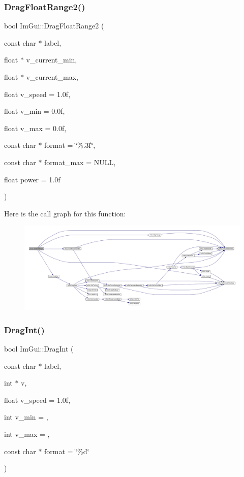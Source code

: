 \subsubsection{\texorpdfstring{Drag\+Float\+Range2()}{DragFloatRange2()}}
{\footnotesize\ttfamily bool Im\+Gui\+::\+Drag\+Float\+Range2 (\begin{DoxyParamCaption}\item[{const char $\ast$}]{label,  }\item[{float $\ast$}]{v\+\_\+current\+\_\+min,  }\item[{float $\ast$}]{v\+\_\+current\+\_\+max,  }\item[{float}]{v\+\_\+speed = {\ttfamily 1.0f},  }\item[{float}]{v\+\_\+min = {\ttfamily 0.0f},  }\item[{float}]{v\+\_\+max = {\ttfamily 0.0f},  }\item[{const char $\ast$}]{format = {\ttfamily \char`\"{}\%.3f\char`\"{}},  }\item[{const char $\ast$}]{format\+\_\+max = {\ttfamily NULL},  }\item[{float}]{power = {\ttfamily 1.0f} }\end{DoxyParamCaption})}

Here is the call graph for this function\+:
\nopagebreak
\begin{figure}[H]
\begin{center}
\leavevmode
\includegraphics[width=350pt]{namespace_im_gui_a6f27fa140df683e09943411c959a1f2b_cgraph}
\end{center}
\end{figure}
\mbox{\label{namespace_im_gui_a202444c7b59820ae0a16d26f4322b4a9}} 
\subsubsection{\texorpdfstring{Drag\+Int()}{DragInt()}}
{\footnotesize\ttfamily bool Im\+Gui\+::\+Drag\+Int (\begin{DoxyParamCaption}\item[{const char $\ast$}]{label,  }\item[{int $\ast$}]{v,  }\item[{float}]{v\+\_\+speed = {\ttfamily 1.0f},  }\item[{int}]{v\+\_\+min = {},  }\item[{int}]{v\+\_\+max = {},  }\item[{const char $\ast$}]{format = {\ttfamily \char`\"{}\%d\char`\"{}} }\end{DoxyParamCaption})}

